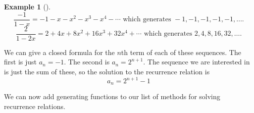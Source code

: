 \documentclass[10pt,]{book}
\theoremstyle{plain}
\theoremstyle{definition}
\theoremstyle{definition}
\newtheorem{example}[theorem]{Example}
\theoremstyle{definition}
\theoremstyle{definition}
\numberwithin{equation}{chapter}
\begin{document}
\begin{example}[]
\begin{equation*}
\frac{-1}{1-x} = -1 - x - x^2 -x^3 - x^4 - \cdots \mbox{ which generates }  -1, -1, -1, -1, -1, \ldots.
\end{equation*}
%
\begin{equation*}
\frac{2}{1-2x} = 2 + 4x + 8x^2 + 16x^3 + 32x^4 + \cdots \mbox{ which generates }  2, 4, 8, 16, 32, \ldots.
\end{equation*}
%
\par
\hypertarget{p-1007}{}%
We can give a closed formula for the \(n\)th term of each of these sequences. The first is just \(a_n = -1\). The second is \(a_n = 2^{n+1}\). The sequence we are interested in is just the sum of these, so the solution to the recurrence relation is%
\begin{equation*}
a_n = 2^{n+1} - 1
\end{equation*}
%
\end{example}
\hypertarget{p-1008}{}%
We can now add generating functions to our list of methods for solving recurrence relations.%
\typeout{************************************************}
\typeout{************************************************}
\end{document}
